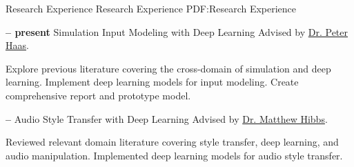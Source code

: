 \Section
{Research Experience}
{Research Experience}
{PDF:Research Experience}

\Entry
\UMassTitle
\dotfill
\textbf{ -- present}
\SubEntry
\Gap
Simulation Input Modeling with Deep Learning
\Gap
Advised by \href{https://people.cs.umass.edu/~phaas/}{Dr. Peter Haas}.
\begin{Detail}
    \SubBulletItem
    Explore previous literature covering the cross-domain of simulation and deep learning.
    \SubBulletItem
    Implement deep learning models for input modeling.
    \SubBulletItem
    Create comprehensive report and prototype model.
\end{Detail}

\BigGap
\Entry
\TrinityTitle
\dotfill
\textbf{ -- }
\SubEntry
\Gap
Audio Style Transfer with Deep Learning
\Gap
Advised by \href{http://www.cs.trinity.edu/~mhibbs/}{Dr. Matthew Hibbs}.
\begin{Detail}
    \SubBulletItem
    Reviewed relevant domain literature covering style transfer, deep learning, and audio manipulation.
    \SubBulletItem
    Implemented deep learning models for audio style transfer.
\end{Detail}
